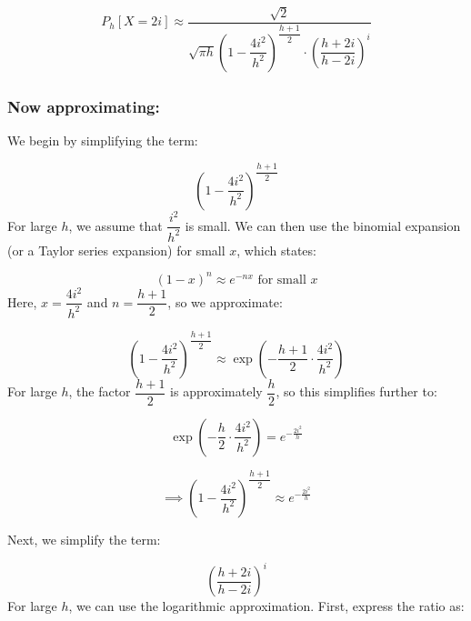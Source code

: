 \begin{equation}
    \begin{aligned}
        P_h[X = 2i] \approx
        \dfrac{\sqrt{2}}
        {\sqrt{\pi h}\left(1-\dfrac{4i^{2}}{h^{2}}\right)^{\dfrac{h + 1}{2}} \cdot
        \left(\dfrac{h + 2i}{h - 2i}\right)^i}
    \end{aligned}
    \label{e2.9}
\end{equation}

\subsubsection*{Now approximating:}

We begin by simplifying the term:

\begin{equation*}
    \left( 1 - \dfrac{4i^2}{h^2} \right)^{\dfrac{h + 1}{2}}
\end{equation*}
For large $h$, we assume that $\dfrac{i^2}{h^2}$ is small. We can then
use the binomial expansion (or a Taylor series expansion) for small $x$, which
states:

\begin{equation*}
    (1 - x)^n \approx e^{-nx} \text{ for small } x
\end{equation*}
Here, $x = \dfrac{4i^2}{h^2}$ and $n = \dfrac{h + 1}{2}$, so we
approximate:

\begin{equation*}
    \left( 1 - \dfrac{4i^2}{h^2} \right)^{\dfrac{h + 1}{2}} \approx
    \exp {\left(-\dfrac{h + 1}{2} \cdot \dfrac{4i^2}{h^2}\right)}
\end{equation*}
For large $h$, the factor $\dfrac{h + 1}{2}$ is approximately
$\dfrac{h}{2}$, so this simplifies further to:

\begin{equation*}
    \exp{\left(-\frac{h}{2} \cdot \frac{4i^2}{h^2}\right)} =
    e^{-\frac{2i^2}{h}}
\end{equation*}

\begin{equation}
    \implies \left( 1 - \dfrac{4i^2}{h^2} \right)^{\dfrac{h+1}{2}} \approx
    e^{-\frac{2i^2}{h}}
    \label{e2.10}
\end{equation}

\vspace{20pt}
\noindent Next, we simplify the term:

\begin{equation*}
    \left(\dfrac{h + 2i}{h - 2i}\right)^i
\end{equation*}
For large $h$, we can use the logarithmic approximation. First, express
the ratio as:

